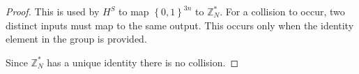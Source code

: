 \documentclass{article}
\begin{document}
\begin{enumerate}
\begin{enumerate}
\begin{proof}
          This is used by $H^S$ to map $\left\{0, 1\right\}^{3n}$ to
          $\mathbb{Z}^{*}_{N}$. For a collision to occur, two distinct inputs
          must map to the same output. This occurs only when the identity
          element in the group is provided.

          Since $\mathbb{Z}^{*}_N$ has a unique identity there is no collision.
        \end{proof}

    \end{enumerate}
\end{enumerate}
\end{document}
